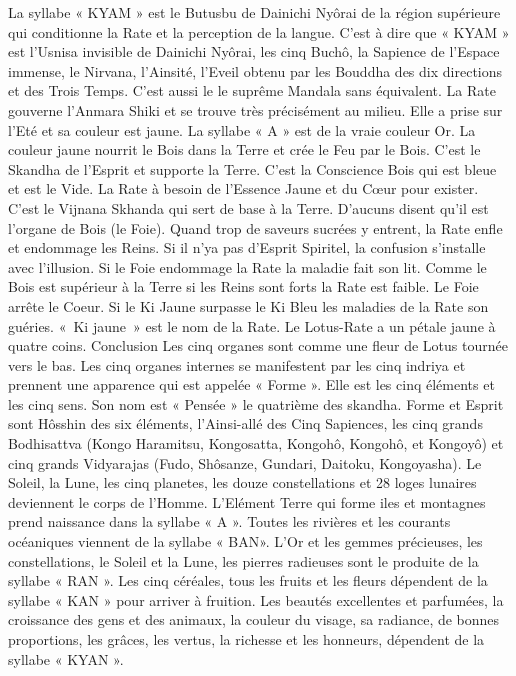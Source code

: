 La syllabe « KYAM » est le Butusbu de Dainichi Nyôrai de la région supérieure qui conditionne la Rate et la perception de la langue. C’est à dire que « KYAM » est l’Usnisa invisible de Dainichi Nyôrai, les cinq Buchô, la Sapience de l’Espace immense, le Nirvana, l’Ainsité, l’Eveil obtenu par les Bouddha des dix directions et des Trois Temps. C’est aussi le le suprême Mandala sans équivalent.
La Rate gouverne l’Anmara Shiki et se trouve très précisément au milieu. Elle a prise sur l’Eté et sa couleur est jaune. La syllabe « A » est de la vraie couleur Or. La couleur jaune nourrit le Bois dans la Terre et crée le Feu par le Bois. C’est le Skandha de l’Esprit et supporte la Terre. C’est la Conscience Bois qui est bleue et est le Vide. La Rate à besoin de l’Essence Jaune et du Cœur pour exister.
C'est le Vijnana Skhanda qui sert de base à la Terre. D'aucuns disent qu'il est l'organe de Bois (le Foie).
Quand trop de saveurs sucrées y entrent, la Rate enfle et endommage les Reins. Si il n'ya pas d'Esprit Spiritel, la confusion s'installe avec l'illusion. Si le Foie endommage la Rate la maladie fait son lit.
Comme le Bois est supérieur à la Terre si les Reins sont forts la Rate est faible. Le Foie arrête le Coeur.  Si le Ki Jaune surpasse le Ki Bleu les maladies de la Rate son guéries. « Ki jaune » est le nom de la Rate.
Le Lotus-Rate a un pétale jaune à quatre coins.
Conclusion
Les cinq organes sont comme une fleur de Lotus tournée vers le bas. Les cinq organes internes se manifestent par les cinq indriya et prennent une apparence qui est appelée « Forme ». Elle est les cinq éléments et les cinq sens. Son nom est « Pensée » le quatrième des skandha.
Forme et Esprit sont Hôsshin des six éléments, l’Ainsi-allé des Cinq Sapiences, les cinq grands Bodhisattva (Kongo Haramitsu, Kongosatta, Kongohô, Kongohô, et Kongoyô) et cinq grands Vidyarajas (Fudo, Shôsanze, Gundari, Daitoku, Kongoyasha).
Le Soleil, la Lune, les cinq planetes, les douze constellations et 28 loges lunaires deviennent le corps de l'Homme.
L’Elément Terre qui forme iles et montagnes prend naissance dans la syllabe « A ». Toutes les rivières et les courants océaniques viennent de la syllabe « BAN». L’Or et les gemmes précieuses, les constellations, le Soleil et la Lune, les pierres radieuses sont le produite de la syllabe « RAN ». Les cinq céréales, tous les fruits et les fleurs dépendent de la syllabe « KAN » pour arriver à fruition. Les beautés excellentes et parfumées, la croissance des gens et des animaux, la couleur du visage, sa radiance, de bonnes proportions, les grâces, les vertus, la richesse et les honneurs, dépendent de la syllabe « KYAN ».
